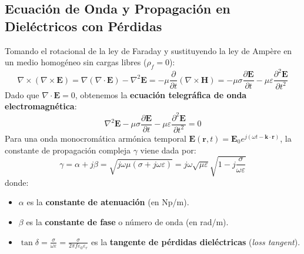 \documentclass[11pt,a4paper]{article}
\begin{document}
\subsection{Ecuaci{\'o}n de Onda y Propagaci{\'o}n en Diel{\'e}ctricos con P{\'e}rdidas}
Tomando el rotacional de la ley de Faraday y sustituyendo la ley de Amp{\`e}re en un medio homog{\'e}neo sin cargas libres ($\rho_f = 0$):
\begin{equation}
    \nabla \times (\nabla \times \mathbf{E}) = \nabla(\nabla \cdot \mathbf{E}) - \nabla^2 \mathbf{E} = -\mu \frac{\partial}{\partial t}(\nabla \times \mathbf{H}) = -\mu \sigma \frac{\partial \mathbf{E}}{\partial t} - \mu \varepsilon \frac{\partial^2 \mathbf{E}}{\partial t^2}
\end{equation}
Dado que $\nabla \cdot \mathbf{E} = 0$, obtenemos la \textbf{ecuaci{\'o}n telegr{\'a}fica de onda electromagn{\'e}tica}:
\begin{equation}
    \nabla^2 \mathbf{E} - \mu \sigma \frac{\partial \mathbf{E}}{\partial t} - \mu \varepsilon \frac{\partial^2 \mathbf{E}}{\partial t^2} = 0
\end{equation}
Para una onda monocrom{\'a}tica arm{\'o}nica temporal $\mathbf{E}(\mathbf{r}, t) = \mathbf{E}_0 e^{j(\omega t - \mathbf{k} \cdot \mathbf{r})}$, la constante de propagaci{\'o}n compleja $\gamma$ viene dada por:
\begin{equation}
    \gamma = \alpha + j\beta = \sqrt{j\omega\mu(\sigma + j\omega\varepsilon)} = j\omega\sqrt{\mu\varepsilon}\sqrt{1 - j\frac{\sigma}{\omega\varepsilon}}
\end{equation}
donde:
\begin{itemize}
    \item $\alpha$ es la \textbf{constante de atenuaci{\'o}n} (en Np/m).
    \item $\beta$ es la \textbf{constante de fase} o n{\'u}mero de onda (en rad/m).
    \item $\tan\delta = \frac{\sigma}{\omega\varepsilon} = \frac{\sigma}{2\pi f \varepsilon_0 \varepsilon_r}$ es la \textbf{tangente de p{\'e}rdidas diel{\'e}ctricas} (\textit{loss tangent}).
\end{itemize}
\end{document}
